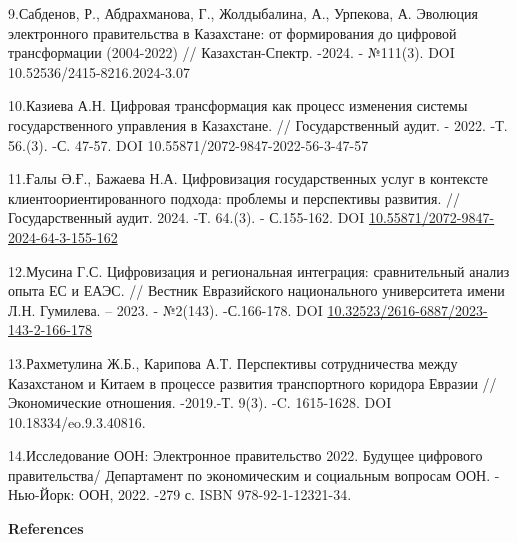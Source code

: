\begin{references}
9.Сабденов, Р., Абдрахманова, Г., Жолдыбалина, А., Урпекова, А. Эволюция
электронного правительства в Казахстане: от формирования до цифровой
трансформации (2004-2022) // Казахстан-Спектр. -2024. - №111(3). DOI
10.52536/2415-8216.2024-3.07

10.Казиева А.Н. Цифровая трансформация как процесс изменения системы
государственного управления в Казахстане. // Государственный аудит. -
2022. -Т. 56.(3). -С. 47-57. DOI 10.55871/2072-9847-2022-56-3-47-57

11.Ғалы Ә.Ғ., Бажаева Н.А. Цифровизация государственных услуг в
контексте клиентоориентированного подхода: проблемы и перспективы
развития. // Государственный аудит. 2024. -Т. 64.(3). - С.155-162. DOI
\href{https://doi.org/10.55871/2072-9847-2024-64-3-155-162}{10.55871/2072-9847-2024-64-3-155-162}

12.Мусина Г.С. Цифровизация и региональная интеграция: сравнительный
анализ опыта ЕС и ЕАЭС. // Вестник Евразийского национального
университета имени Л.Н. Гумилева. -- 2023. - №2(143). -С.166-178. DOI
\href{https://doi.org/10.32523/2616-6887/2023-143-2-166-178}{10.32523/2616-6887/2023-143-2-166-178}

13.Рахметулина Ж.Б., Карипова А.Т. Перспективы сотрудничества между
Казахстаном и Китаем в процессе развития транспортного коридора Евразии
// Экономические отношения. -2019.-Т. 9(3). -C. 1615-1628. DOI
10.18334/eo.9.3.40816.

14.Исследование ООН: Электронное правительство 2022. Будущее цифрового
правительства/ Департамент по экономическим и социальным вопросам ООН. -
Нью-Йорк: ООН, 2022. -279 с. ISBN 978-92-1-12321-34.
\end{references}

\begin{center}
{\bfseries References}
\end{center}

